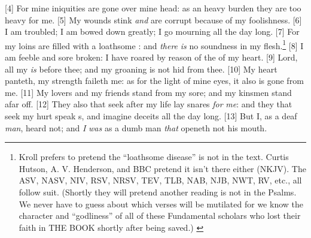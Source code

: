 [4] \textcolor[cmyk]{0.99998,1,0,0}{For mine iniquities are gone over mine head: as an heavy burden they are too heavy for me.}%
[5] \textcolor[cmyk]{0.99998,1,0,0}{My wounds stink \emph{and} are corrupt because of my foolishness.}
[6] \textcolor[cmyk]{0.99998,1,0,0}{I am troubled; I am bowed down greatly; I go mourning all the day long.}
[7] \textcolor[cmyk]{0.99998,1,0,0}{For my loins are filled with a loathsome : and \emph{there} \emph{is} no soundness in my flesh.}\footnote{Kroll prefers to pretend the “loathsome disease” is not in the text. Curtis Hutson, A. V. Henderson, and BBC pretend it isn’t there either (NKJV). The ASV, NASV, NIV, RSV, NRSV, TEV, TLB, NAB, NJB, NWT, RV, etc., all follow suit. (Shortly they will pretend another reading is not in the Psalms. We never have to guess about which verses will be mutilated for we know the character and “godliness” of all of these Fundamental scholars who lost their faith in THE BOOK shortly after being saved.)  \cite{Ruckman1992Psalms}}
[8] \textcolor[cmyk]{0.99998,1,0,0}{I am feeble and sore broken: I have roared by reason of the  of my heart.}
[9] \textcolor[cmyk]{0.99998,1,0,0}{Lord, all my  \emph{is} before thee; and my groaning is not hid from thee.}
[10] \textcolor[cmyk]{0.99998,1,0,0}{My heart panteth, my strength faileth me: as for the light of mine eyes, it also is gone from me.}
[11] \textcolor[cmyk]{0.99998,1,0,0}{My lovers and my friends stand  from my sore; and my kinsmen stand afar off.}
[12] \textcolor[cmyk]{0.99998,1,0,0}{They also that seek after my life lay snares \emph{for} \emph{me}: and they that seek my hurt speak s, and imagine deceits all the day long.}
[13] \textcolor[cmyk]{0.99998,1,0,0}{But I, as a deaf \emph{man}, heard not; and \emph{I} \emph{was} as a dumb man \emph{that} openeth not his mouth.}
